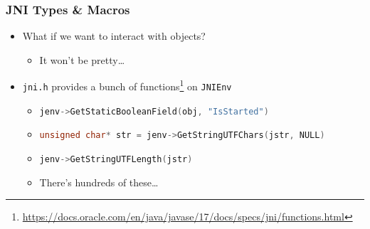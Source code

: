 \documentclass[10pt,mathserif]{beamer}
\begin{document}
	\begin{frame}[fragile]
		\frametitle{JNI Types \& Macros}

		\begin{itemize}
			\item What if we want to interact with objects?
			\begin{itemize}
				\item It won't be pretty\dots
			\end{itemize}
			\item \lstinline{jni.h} provides a bunch of functions\footnote{\href{https://docs.oracle.com/en/java/javase/17/docs/specs/jni/functions.html}{https://docs.oracle.com/en/java/javase/17/docs/specs/jni/functions.html}} on \lstinline{JNIEnv}
			\begin{itemize}
				\item \lstinline[language=c]{jenv->GetStaticBooleanField(obj, "IsStarted")}
				\item \lstinline[language=c]{unsigned char* str = jenv->GetStringUTFChars(jstr, NULL)}
				\item \lstinline[language=c]{jenv->GetStringUTFLength(jstr)}
				\item There's hundreds of these\dots
			\end{itemize}
		\end{itemize}


	\end{frame}
\end{document}

